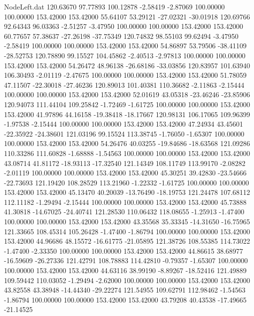 \begin{filecontents}{NodeLeft.dat}
 120.63670   97.77893  100.12878    -2.58419   -2.87069  100.00000  100.00000  153.42000  153.42000   55.64107   53.29121  -27.02321  -30.01918
 120.69766   92.64343   96.03363    -2.51257   -3.47950  100.00000  100.00000  153.42000  153.42000   60.77657   57.38637  -27.26198  -37.75349
 120.74832   98.55103   99.62494    -3.47950   -2.58419  100.00000  100.00000  153.42000  153.42000   54.86897   53.79506  -38.41109  -28.52753
 120.78890   99.15527  104.45862    -2.40513   -2.97813  100.00000  100.00000  153.42000  153.42000   54.26472   48.96138  -26.68186  -33.03856
 120.83957  101.63940  106.30493    -2.01119   -2.47675  100.00000  100.00000  153.42000  153.42000   51.78059   47.11507  -22.30018  -27.46236
 120.89013  101.40381  110.36682    -2.11863   -2.15444  100.00000  100.00000  153.42000  153.42000   52.01619   43.05318  -23.46246  -23.85906
 120.94073  111.44104  109.25842    -1.72469   -1.61725  100.00000  100.00000  153.42000  153.42000   41.97896   44.16158  -19.38418  -18.17667
 120.98131  106.17065  109.96399    -1.97538   -2.15444  100.00000  100.00000  153.42000  153.42000   47.24934   43.45601  -22.35922  -24.38601
 121.03196   99.15524  113.38745    -1.76050   -1.65307  100.00000  100.00000  153.42000  153.42000   54.26476   40.03255  -19.84686  -18.63568
 121.09286  110.33286  111.60828    -1.68888   -1.54563  100.00000  100.00000  153.42000  153.42000   43.08714   41.81172  -18.93113  -17.32540
 121.14349  108.11749  113.99170    -2.08282   -2.01119  100.00000  100.00000  153.42000  153.42000   45.30251   39.42830  -23.54666  -22.73693
 121.19420  108.28529  113.21960    -1.22332   -1.61725  100.00000  100.00000  153.42000  153.42000   45.13470   40.20039  -13.76490  -18.19753
 121.24478  107.68112  112.11182    -1.29494   -2.15444  100.00000  100.00000  153.42000  153.42000   45.73888   41.30818  -14.67025  -24.40741
 121.28530  110.06432  118.08655    -1.25913   -1.47400  100.00000  100.00000  153.42000  153.42000   43.35568   35.33345  -14.31650  -16.75965
 121.33665  108.45314  105.26428    -1.47400   -1.86794  100.00000  100.00000  153.42000  153.42000   44.96686   48.15572  -16.61775  -21.05895
 121.38726  108.55385  114.73022    -1.47400   -2.33350  100.00000  100.00000  153.42000  153.42000   44.86615   38.68977  -16.59609  -26.27336
 121.42791  108.78883  114.42810    -0.79357   -1.65307  100.00000  100.00000  153.42000  153.42000   44.63116   38.99190   -8.89267  -18.52416
 121.49889  109.59442  110.03052    -1.29494   -2.62000  100.00000  100.00000  153.42000  153.42000   43.82558   43.38948  -14.44340  -29.22274
 121.54955  109.62791  112.98462    -1.54563   -1.86794  100.00000  100.00000  153.42000  153.42000   43.79208   40.43538  -17.49665  -21.14525

\end{filecontents}
